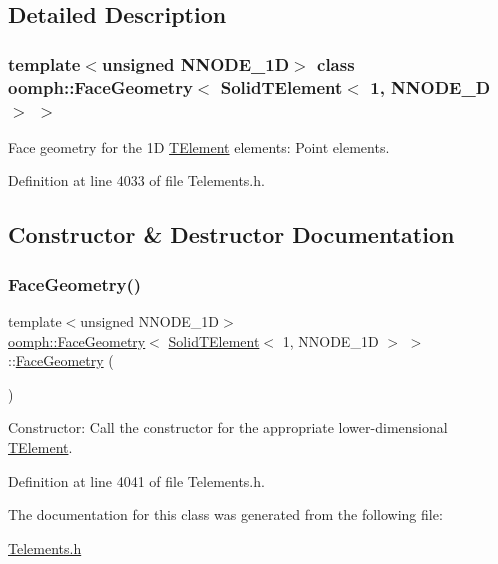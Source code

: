 \subsection{Detailed Description}
\subsubsection*{template$<$unsigned N\+N\+O\+D\+E\+\_\+1D$>$\newline
class oomph\+::\+Face\+Geometry$<$ Solid\+T\+Element$<$ 1, N\+N\+O\+D\+E\+\_\+D $>$ $>$}

Face geometry for the 1D \hyperlink{classoomph_1_1TElement}{T\+Element} elements\+: Point elements. 

Definition at line 4033 of file Telements.\+h.



\subsection{Constructor \& Destructor Documentation}
\mbox{\label{classoomph_1_1FaceGeometry_3_01SolidTElement_3_011_00_01NNODE__1D_01_4_01_4_a1d055bea9a9968dddb59720ec9961425}} 
\subsubsection{\texorpdfstring{Face\+Geometry()}{FaceGeometry()}}
{\footnotesize\ttfamily template$<$unsigned N\+N\+O\+D\+E\+\_\+1D$>$ \\
\hyperlink{classoomph_1_1FaceGeometry}{oomph\+::\+Face\+Geometry}$<$ \hyperlink{classoomph_1_1SolidTElement}{Solid\+T\+Element}$<$ 1, N\+N\+O\+D\+E\+\_\+1D $>$ $>$\+::\hyperlink{classoomph_1_1FaceGeometry}{Face\+Geometry} (\begin{DoxyParamCaption}{ }\end{DoxyParamCaption})\hspace{0.3cm}{\ttfamily [inline]}}



Constructor\+: Call the constructor for the appropriate lower-\/dimensional \hyperlink{classoomph_1_1TElement}{T\+Element}. 



Definition at line 4041 of file Telements.\+h.



The documentation for this class was generated from the following file\+:\begin{DoxyCompactItemize}
\item 
\hyperlink{Telements_8h}{Telements.\+h}\end{DoxyCompactItemize}
